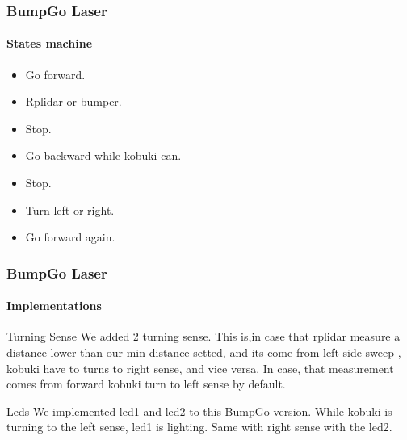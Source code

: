 \documentclass{beamer}
\begin{document}
\begin{frame}
\frametitle{BumpGo Laser}
\framesubtitle{States machine}

\begin{itemize}

	\item Go forward. \\ \item Rplidar or bumper.\\ \item Stop.
	\item Go backward while kobuki can. \\ \item Stop.\\ \item Turn left or right.\\ \item Go forward again.

\end{itemize}



\end{frame}

\begin{frame}
\frametitle{BumpGo Laser}
\framesubtitle{Implementations}
\begin{block}{Turning Sense}
	We added 2 turning sense. This is,in case that rplidar measure a distance lower than our min distance setted, and its come from left side sweep , kobuki have to turns to
	right sense, and vice versa. In case, that measurement comes from forward kobuki turn to left sense by default.
\end{block}

\begin{block}{Leds}
	We implemented led1 and led2 to this BumpGo version. While kobuki is turning to the 		left sense, led1 is lighting. Same with right sense with the led2.
\end{block}


\end{frame}
\end{document}
